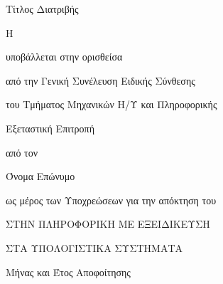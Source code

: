 \thispagestyle{empty}
\begin{center}
	{\LARGE Τίτλος Διατριβής}
	\par
	\vspace{2.5cm} {\Large Η \csethesisTypeEl}
	
	\vspace{1.25cm} {\Large υποβάλλεται στην ορισθείσα}
	
	\vspace{0.75cm} {\Large από την Γενική Συνέλευση Ειδικής Σύνθεσης}
	
	\vspace{0.25cm} {\Large του Τμήματος Μηχανικών Η/Υ και Πληροφορικής}
	
	\vspace{0.25cm} {\Large Εξεταστική Επιτροπή}
	
	\vspace{1.25cm} {\Large από τον}
	
	\vspace{1.75cm} {\LARGE Όνομα Επώνυμο}
	
	\vspace{1.25cm} {\Large ως μέρος των Υποχρεώσεων για την απόκτηση του}
	
	\vspace{1.75cm} {\Large \csediplwmaEl}
	
	\vspace{0.5cm} {\Large ΣΤΗΝ ΠΛΗΡΟΦΟΡΙΚΗ ΜΕ ΕΞΕΙΔΙΚΕΥΣΗ}
	
	\vspace{0.5cm} {\Large ΣΤΑ ΥΠΟΛΟΓΙΣΤΙΚΑ ΣΥΣΤΗΜΑΤΑ}
	\par
	\vfill {\Large Μήνας και Έτος Αποφοίτησης}
\end{center}